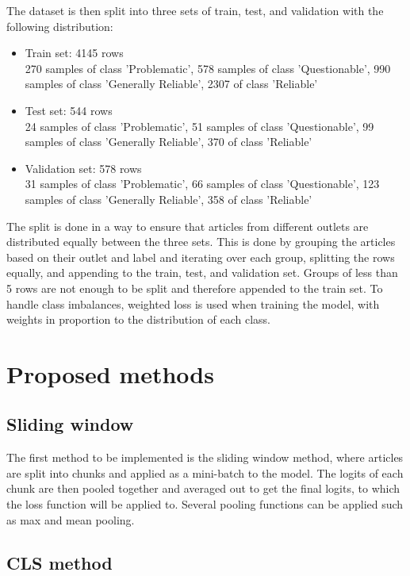The dataset is then split into three sets of train, test, and validation with the following distribution:
\begin{itemize}
    \item Train set: 4145 rows \\
          270 samples of class 'Problematic', 578 samples of class 'Questionable', 990 samples of class 'Generally Reliable', 2307 of class 'Reliable'
    \item Test set: 544 rows \\
          24 samples of class 'Problematic', 51 samples of class 'Questionable', 99 samples of class 'Generally Reliable', 370 of class 'Reliable'
    \item Validation set: 578 rows \\
          31 samples of class 'Problematic', 66 samples of class 'Questionable', 123 samples of class 'Generally Reliable', 358 of class 'Reliable'
\end{itemize}

The split is done in a way to ensure that articles from different outlets are distributed equally between the three sets. This is done by grouping the articles based on their outlet and label and iterating over each group, splitting the rows equally, and appending to the train, test, and validation set. Groups of less than 5 rows are not enough to be split and therefore appended to the train set. To handle class imbalances, weighted loss is used when training the model, with weights in proportion to the distribution of each class.

\section{Proposed methods}

\subsection{Sliding window}

The first method to be implemented is the sliding window method, where articles are split into chunks and applied as a mini-batch to the model. The logits of each chunk are then pooled together and averaged out to get the final logits, to which the loss function will be applied to. Several pooling functions can be applied such as max and mean pooling.

\subsection{CLS method}

